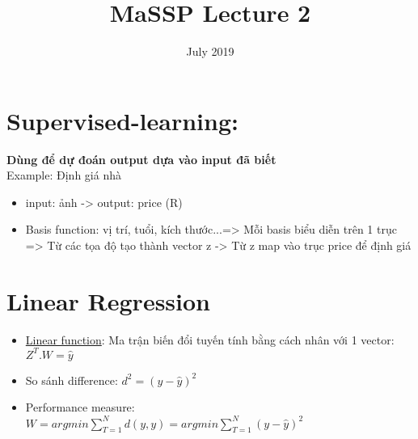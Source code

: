 \documentclass{article}
\title{MaSSP Lecture 2}
\date{July 2019}
\begin{document}
\maketitle

\section{Supervised-learning: }
\textbf{Dùng để dự đoán output dựa vào input đã biết} \\
Example: Định giá nhà
\begin{itemize}
    \item input: ảnh -> output: price (R) 
    \item Basis function: vị trí, tuổi, kích thước...=> Mỗi basis biểu diễn trên 1 trục
    => Từ các tọa độ tạo thành vector z -> Từ z map vào trục price để định giá
\end{itemize}

\section{Linear Regression}
\begin{itemize}
    \item \underline{Linear function}: Ma trận biến đổi tuyến tính bằng cách nhân với 1 vector: $Z^T.W=\hat{y}$ 
    \item So sánh difference: $d^2 = (y-\hat{y})^2$
    \item Performance measure: \\ 
    $W= argmin \sum_{T=1}^N d(y,y) = argmin \sum_{T=1}^N(y-\hat{y})^2$
\end{itemize}
\end{document}
